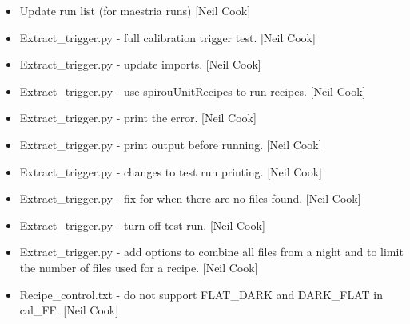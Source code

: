 \documentclass[a4paper,10pt,english]{report}
\begin{document}
\begin{itemize}
\item {} 
Update run list (for maestria runs) {[}Neil Cook{]}

\item {} 
Extract\_trigger.py - full calibration trigger test. {[}Neil Cook{]}

\item {} 
Extract\_trigger.py - update imports. {[}Neil Cook{]}

\item {} 
Extract\_trigger.py - use spirouUnitRecipes to run recipes. {[}Neil Cook{]}

\item {} 
Extract\_trigger.py - print the error. {[}Neil Cook{]}

\item {} 
Extract\_trigger.py - print output before running. {[}Neil Cook{]}

\item {} 
Extract\_trigger.py - changes to test run printing. {[}Neil Cook{]}

\item {} 
Extract\_trigger.py - fix for when there are no files found. {[}Neil
Cook{]}

\item {} 
Extract\_trigger.py - turn off test run. {[}Neil Cook{]}

\item {} 
Extract\_trigger.py - add options to combine all files from a night and
to limit the number of files used for a recipe. {[}Neil Cook{]}

\item {} 
Recipe\_control.txt - do not support FLAT\_DARK and DARK\_FLAT in cal\_FF.
{[}Neil Cook{]}

\end{itemize}
\end{document}

